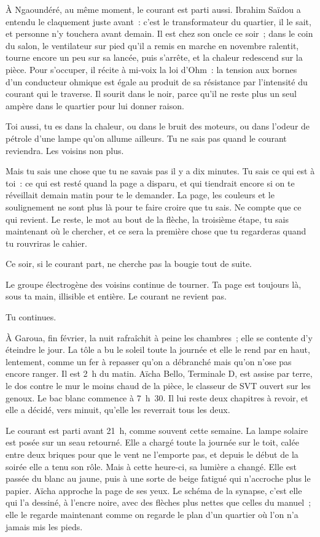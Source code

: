 \documentclass[10.5pt,twoside,openright]{book}
\newcommand{\chapitre}[2]{\cleardoublepage\markright{#2}\thispagestyle{plain}\vspace*{2.2cm}{\noindent\color{accent}\fontsize{54}{54}\selectfont\bfseries #1}\par\vspace{0.5em}{\noindent\LARGE\bfseries #2\par}\vspace{1.6em}\noindent\ignorespaces}
\begin{document}
À Ngaoundéré, au même moment, le courant est parti aussi. Ibrahim Saïdou a entendu le claquement juste avant : c’est le transformateur du quartier, il le sait, et personne n’y touchera avant demain. Il est chez son oncle ce soir ; dans le coin du salon, le ventilateur sur pied qu’il a remis en marche en novembre ralentit, tourne encore un peu sur sa lancée, puis s’arrête, et la chaleur redescend sur la pièce. Pour s’occuper, il récite à mi-voix la loi d’Ohm : la tension aux bornes d’un conducteur ohmique est égale au produit de sa résistance par l’intensité du courant qui le traverse. Il sourit dans le noir, parce qu’il ne reste plus un seul ampère dans le quartier pour lui donner raison.

Toi aussi, tu es dans la chaleur, ou dans le bruit des moteurs, ou dans l’odeur de pétrole d’une lampe qu’on allume ailleurs. Tu ne sais pas quand le courant reviendra. Les voisins non plus.

Mais tu sais une chose que tu ne savais pas il y a dix minutes. Tu sais ce qui est à toi : ce qui est resté quand la page a disparu, et qui tiendrait encore si on te réveillait demain matin pour te le demander. La page, les couleurs et le soulignement ne sont plus là pour te faire croire que tu sais. Ne compte que ce qui revient. Le reste, le mot au bout de la flèche, la troisième étape, tu sais maintenant où le chercher, et ce sera la première chose que tu regarderas quand tu rouvriras le cahier.

Ce soir, si le courant part, ne cherche pas la bougie tout de suite.

Le groupe électrogène des voisins continue de tourner. Ta page est toujours là, sous ta main, illisible et entière. Le courant ne revient pas.

Tu continues.


\chapitre{8}{Dormir n’est pas tricher}

À Garoua, fin février, la nuit rafraîchit à peine les chambres ; elle se contente d’y éteindre le jour. La tôle a bu le soleil toute la journée et elle le rend par en haut, lentement, comme un fer à repasser qu’on a débranché mais qu’on n’ose pas encore ranger. Il est 2 h du matin. Aïcha Bello, Terminale D, est assise par terre, le dos contre le mur le moins chaud de la pièce, le classeur de SVT ouvert sur les genoux. Le bac blanc commence à 7 h 30. Il lui reste deux chapitres à revoir, et elle a décidé, vers minuit, qu’elle les reverrait tous les deux.

Le courant est parti avant 21 h, comme souvent cette semaine. La lampe solaire est posée sur un seau retourné. Elle a chargé toute la journée sur le toit, calée entre deux briques pour que le vent ne l’emporte pas, et depuis le début de la soirée elle a tenu son rôle. Mais à cette heure-ci, sa lumière a changé. Elle est passée du blanc au jaune, puis à une sorte de beige fatigué qui n’accroche plus le papier. Aïcha approche la page de ses yeux. Le schéma de la synapse, c’est elle qui l’a dessiné, à l’encre noire, avec des flèches plus nettes que celles du manuel ; elle le regarde maintenant comme on regarde le plan d’un quartier où l’on n’a jamais mis les pieds.
\end{document}

